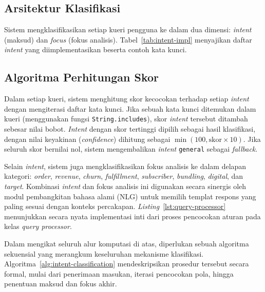\subsection{Arsitektur Klasifikasi}

Sistem mengklasifikasikan setiap kueri pengguna ke dalam dua dimensi: \textit{intent} (maksud) dan \textit{focus} (fokus analisis). Tabel~\ref{tab:intent-impl} menyajikan daftar \textit{intent} yang diimplementasikan beserta contoh kata kunci.



\subsection{Algoritma Perhitungan Skor}

Dalam setiap kueri, sistem menghitung skor kecocokan terhadap setiap \textit{intent} dengan mengiterasi daftar kata kunci. Jika sebuah kata kunci ditemukan dalam kueri (menggunakan fungsi \texttt{String.includes}), skor \textit{intent} tersebut ditambah sebesar nilai bobot. \textit{Intent} dengan skor tertinggi dipilih sebagai hasil klasifikasi, dengan nilai keyakinan (\textit{confidence}) dihitung sebagai $\min(100, \text{skor} \times 10)$\label{sym:min}. Jika seluruh skor bernilai nol, sistem mengembalikan \textit{intent} \texttt{general} sebagai \textit{fallback}.

Selain \textit{intent}, sistem juga mengklasifikasikan fokus analisis ke dalam delapan kategori: \textit{order}, \textit{revenue}, \textit{churn}, \textit{fulfillment}, \textit{subscriber}, \textit{bundling}, \textit{digital}, dan \textit{target}. Kombinasi \textit{intent} dan fokus analisis ini digunakan secara sinergis oleh modul pembangkitan bahasa alami (NLG) untuk memilih templat respons yang paling sesuai dengan konteks percakapan. \textit{Listing}~\ref{lst:query-processor} menunjukkan secara nyata implementasi inti dari proses pencocokan aturan pada kelas \textit{query processor}.



Dalam mengikat seluruh alur komputasi di atas, diperlukan sebuah algoritma sekuensial yang merangkum keseluruhan mekanisme klasifikasi. Algoritma~\ref{alg:intent-classification} mendeskripsikan prosedur tersebut secara formal, mulai dari penerimaan masukan, iterasi pencocokan pola, hingga penentuan maksud dan fokus akhir.



